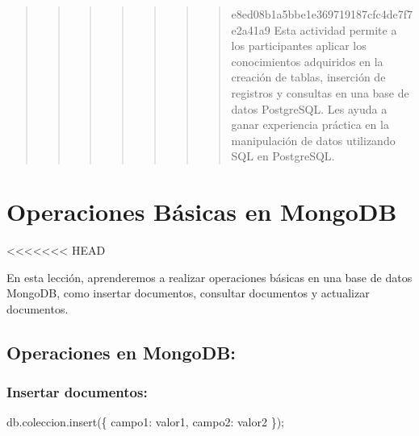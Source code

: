\documentclass[
  a4paper,
  DIV=11,
  numbers=noendperiod,
  onepage,
  openany]{scrreprt}
\newenvironment{Shaded}{\begin{snugshade}}{\end{snugshade}}
\newcommand{\NormalTok}[1]{\textcolor[rgb]{0.00,0.23,0.31}{#1}}
\begin{document}
\begin{quote}
\begin{quote}
\begin{quote}
\begin{quote}
\begin{quote}
\begin{quote}
\begin{quote}
e8ed08b1a5bbe1e369719187cfc4de7f7e2a41a9 Esta actividad permite a los
participantes aplicar los conocimientos adquiridos en la creación de
tablas, inserción de registros y consultas en una base de datos
PostgreSQL. Les ayuda a ganar experiencia práctica en la manipulación de
datos utilizando SQL en PostgreSQL.
\end{quote}
\end{quote}
\end{quote}
\end{quote}
\end{quote}
\end{quote}
\end{quote}

\hypertarget{operaciones-buxe1sicas-en-mongodb-2}{%
\chapter{Operaciones Básicas en
MongoDB}\label{operaciones-buxe1sicas-en-mongodb-2}}

\textless\textless\textless\textless\textless\textless\textless{} HEAD

En esta lección, aprenderemos a realizar operaciones básicas en una base
de datos MongoDB, como insertar documentos, consultar documentos y
actualizar documentos.

\hypertarget{operaciones-en-mongodb}{%
\section{Operaciones en MongoDB:}\label{operaciones-en-mongodb}}

\hypertarget{insertar-documentos}{%
\subsection{Insertar documentos:}\label{insertar-documentos}}

\begin{Shaded}
\begin{Highlighting}[]
\NormalTok{db.coleccion.insert(\{ campo1: valor1, campo2: valor2 \});}
\end{Highlighting}
\end{Shaded}
\end{document}
